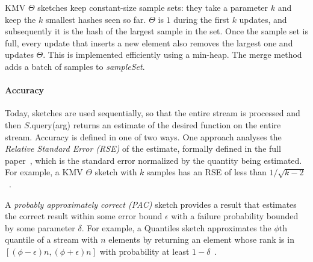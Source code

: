 KMV $\Theta$ sketches keep constant-size sample sets:
they take a parameter $k$ and keep the $k$ smallest hashes seen so far. 
$\Theta$ is $1$ during the first $k$ updates, and 
subsequently it is the hash of the largest sample in the set.
Once the sample set is full,
every update that inserts  a new element also removes the largest
one and updates $\Theta$. This is implemented efficiently using a min-heap.
The merge method adds a batch of samples to \emph{sampleSet}.

\paragraph{Accuracy}

Today, sketches are used sequentially,
so that the entire stream is processed 
and then $S$.query(arg) returns an estimate of the desired function 
on the entire stream. Accuracy is defined in one of two ways.
One approach analyses the \emph{Relative Standard Error (RSE)} of the estimate, 
formally defined in the full paper~\cite{rinberg2019fast}, %
which is the standard error normalized by the quantity being estimated.
For example, a KMV $\Theta$ sketch with $k$ samples has an RSE of less than $1/\sqrt{k-2}$~\cite{KMV}.

 A \emph{probably approximately correct (PAC)} sketch provides a result that estimates the correct result
within some error bound $\epsilon$ with a failure probability bounded by some parameter $\delta$.  
For example, a Quantiles sketch approximates the $\phi$th quantile of a stream with $n$ elements 
by returning an element whose rank is in $\left[(\phi-\epsilon)n , (\phi+\epsilon)n \right]$ with 
probability at least $1-\delta$~\cite{Agarwal:2012}.